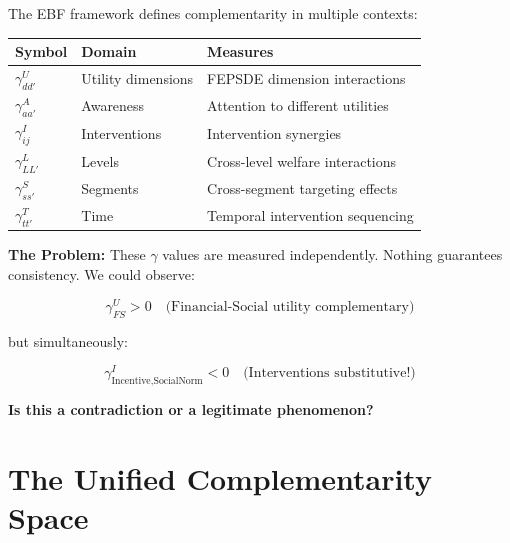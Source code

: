 \begin{tcolorbox}[colback=red!5!white, colframe=red!75!black,
    title=The Fundamental Problem]

The EBF framework defines complementarity in multiple contexts:

\begin{center}
\renewcommand{\arraystretch}{1.3}
\begin{tabular}{lll}
\textbf{Symbol} & \textbf{Domain} & \textbf{Measures} \\
\hline
$\gamma^U_{dd'}$ & Utility dimensions & FEPSDE dimension interactions \\
$\gamma^A_{aa'}$ & Awareness & Attention to different utilities \\
$\gamma^I_{ij}$ & Interventions & Intervention synergies \\
$\gamma^L_{LL'}$ & Levels & Cross-level welfare interactions \\
$\gamma^S_{ss'}$ & Segments & Cross-segment targeting effects \\
$\gamma^T_{tt'}$ & Time & Temporal intervention sequencing \\
\end{tabular}
\end{center}

\textbf{The Problem:} These $\gamma$ values are measured independently. Nothing
guarantees consistency. We could observe:

\begin{equation}
\gamma^U_{FS} > 0 \quad \text{(Financial-Social utility complementary)}
\end{equation}

but simultaneously:

\begin{equation}
\gamma^I_{\text{Incentive}, \text{SocialNorm}} < 0 \quad \text{(Interventions substitutive!)}
\end{equation}

\textbf{Is this a contradiction or a legitimate phenomenon?}

\end{tcolorbox}

\section{The Unified Complementarity Space}
\label{sec:gtc-space}

